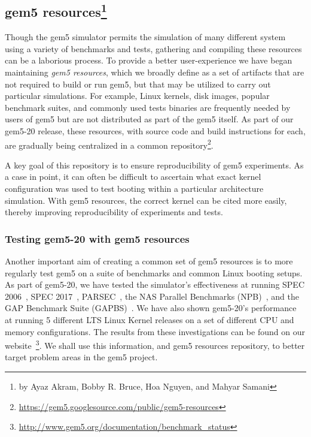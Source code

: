 \subsection[gem5 resources]{gem5 resources\footnote{by Ayaz Akram, Bobby R. Bruce, Hoa Nguyen, and Mahyar Samani}}
\label{sec:resources}

Though the gem5 simulator permits the simulation of many different system
using a variety of benchmarks and tests, gathering and compiling these
resources can be a laborious process. To provide
a better user-experience we have began maintaining \emph{gem5
resources}, which we broadly define as a set of artifacts
that are not required to build or run gem5, but that may be utilized to carry
out particular simulations. For example, Linux kernels, disk images, popular
benchmark suites, and commonly used tests binaries are frequently needed by
users of gem5 but are not distributed as part of the gem5 itself. As part of
our gem5-20 release, these resources, with source code and build instructions
for each, are gradually being centralized in a common repository\footnote{
\url{https://gem5.googlesource.com/public/gem5-resources}}.

A key goal of this repository is to ensure reproducibility of gem5
experiments. As a case in point, it can often be difficult to ascertain what exact
kernel configuration was used to test booting within a particular architecture
simulation. With gem5 resources, the correct kernel can be cited more easily,
thereby improving reproducibility of experiments and tests.

\subsubsection{Testing gem5-20 with gem5 resources}

Another important aim of creating a common set of gem5 resources is to more
regularly test gem5 on a suite of benchmarks and common Linux booting setups.
As part of gem5-20, we have tested the simulator's effectiveness
at running SPEC 2006~\cite{spec06}, SPEC 2017~\cite{spec17},
PARSEC~\cite{parsec}, the NAS Parallel Benchmarks (NPB)~\cite{npb},
and the GAP Benchmark Suite (GAPBS)~\cite{gapbs}. We have also shown gem5-20's
performance at running 5 different LTS Linux Kernel releases on a set of
different CPU and memory configurations. The results from these investigations
can be found on our website~\footnote{
\url{http://www.gem5.org/documentation/benchmark_status}}. We shall use this
information, and gem5 resources repository, to better target problem areas in
the gem5 project.

